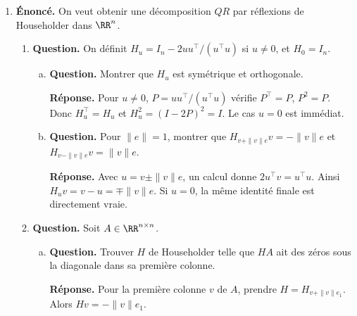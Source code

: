 \documentclass[12pt, a4paper]{article}
\begin{document}
\begin{enumerate}[label=8.\arabic*., start=70]
\begin{minipage}[t]{\linewidth}
\begin{enumerate}[\arabic*.]
        \item \textbf{Question.} Montrer que $\mathcal S\perp\mathcal A$.
\par\smallskip
\textbf{Réponse.} Si $S^\top=S$ et $A^\top=-A$, alors
        $\operatorname{tr}(SA)=\operatorname{tr}((SA)^\top)=-\operatorname{tr}(AS)=-\operatorname{tr}(SA)$.
        Donc $\langle S,A\rangle=0$.

  \item \textbf{Question.} Calculer la distance d’une matrice $M$ à $\mathcal S$.
\par\smallskip
\textbf{Réponse.} $M=(M+M^\top)/2+(M-M^\top)/2$ est la décomposition orthogonale.
        \[
          \therefore\operatorname{dist}(M,\mathcal S)=\frac12\|M-M^\top\|_F
        \]

\end{enumerate}
\end{minipage}

  \item \begin{minipage}[t]{\linewidth}\raggedright
\textbf{Énoncé.} On veut obtenir une décomposition $QR$ par réflexions de Householder dans $\RR^n$.

\begin{enumerate}[\arabic*.]
        \item \textbf{Question.} On définit $H_u=I_n-2uu^\top/(u^\top u)$ si $u\neq0$, et $H_0=I_n$.
\begin{enumerate}[a.]
            \item \textbf{Question.} Montrer que $H_u$ est symétrique et orthogonale.
\par\smallskip
\textbf{Réponse.} Pour $u\neq0$, $P=uu^\top/(u^\top u)$ vérifie $P^\top=P$, $P^2=P$.
            Donc $H_u^\top=H_u$ et $H_u^2=(I-2P)^2=I$.
            Le cas $u=0$ est immédiat.

  \item \textbf{Question.} Pour $\|e\|=1$, montrer que $H_{v+\|v\|e}v=-\|v\|e$ et $H_{v-\|v\|e}v=\|v\|e$.
\par\smallskip
\textbf{Réponse.} Avec $u=v\pm\|v\|e$, un calcul donne $2u^\top v=u^\top u$.
            Ainsi $H_uv=v-u=\mp\|v\|e$.
            Si $u=0$, la même identité finale est directement vraie.

\end{enumerate}

  \item \textbf{Question.} Soit $A\in\RR^{n\times n}$.
\begin{enumerate}[a.]
            \item \textbf{Question.} Trouver $H$ de Householder telle que $HA$ ait des zéros sous la diagonale dans sa première colonne.
\par\smallskip
\textbf{Réponse.} Pour la première colonne $v$ de $A$, prendre $H=H_{v+\|v\|e_1}$.
            Alors $Hv=-\|v\|e_1$.


\end{enumerate}
\end{enumerate}
\end{minipage}
\end{enumerate}
\end{document}
